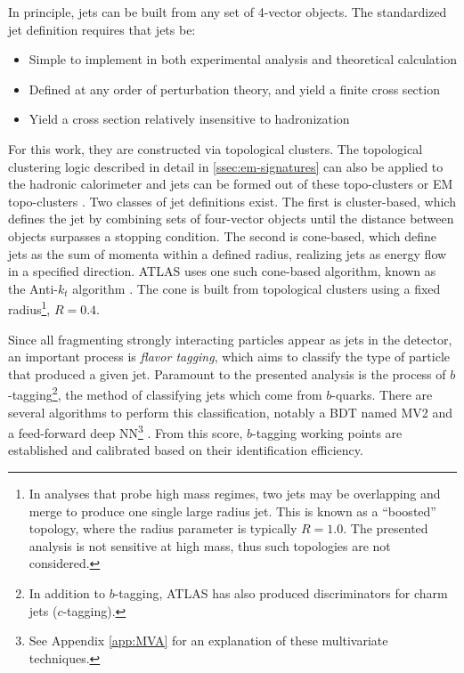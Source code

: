 In principle, jets can be built from any set of 4-vector objects. The standardized jet definition \cite{jet-standardization} requires that jets be:
\begin{itemize}
    \item Simple to implement in both experimental analysis and theoretical calculation
    \item Defined at any order of perturbation theory, and yield a finite cross section
    \item Yield a cross section relatively insensitive to hadronization
\end{itemize}

For this work, they are constructed via topological clusters. The topological clustering logic described in detail in \ref{ssec:em-signatures} can also be applied to the hadronic calorimeter and jets can be formed out of these topo-clusters or \gls{EM} topo-clusters \cite{topo-cluster}. Two classes of jet definitions exist. The first is cluster-based, which defines the jet by combining sets of four-vector objects until the distance between objects surpasses a stopping condition. The second is cone-based, which define jets as the sum of momenta within a defined radius, realizing jets as energy flow in a specified direction. ATLAS uses one such cone-based algorithm, known as the Anti-$k_t$ algorithm \cite{anti-kt}. The cone is built from topological clusters using a fixed radius\footnote{In analyses that probe high mass regimes, two jets may be overlapping and merge to produce one single large radius jet. This is known as a ``boosted'' topology, where the radius parameter is typically $R=1.0$. The presented analysis is not sensitive at high mass, thus such topologies are not considered.}, $R=0.4$.


Since all fragmenting strongly interacting particles appear as jets in the detector, an important process is \textit{flavor tagging}, which aims to classify the type of particle that produced a given jet. Paramount to the presented analysis is the process of $b$-tagging\footnote{In addition to $b$-tagging, ATLAS has also produced discriminators for charm jets ($c$-tagging).}, the method of classifying jets which come from $b$-quarks. There are several algorithms to perform this classification, notably a \gls{BDT} named MV2 \cite{mv2-dl1} and a feed-forward deep \gls{NN}\footnote{See Appendix \ref{app:MVA} for an explanation of these multivariate techniques.} \cite{mv2-dl1}. From this score, $b$-tagging working points are established and calibrated based on their identification efficiency. 


